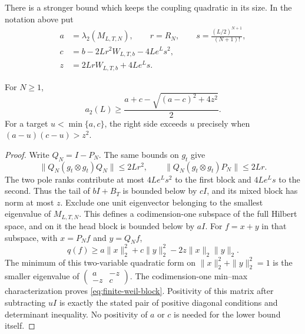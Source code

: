 There is a stronger bound which keeps the coupling quadratic in its
size.  In the notation above put
\[
 \begin{split}
 a&=\lambda_2(M_{L,T,N}),\qquad
 r=R_N,\qquad s=\frac{(L/2)^{N+1}}{(N+1)!},\\
 c&=b-2Lr^2W_{L,T,b}-4Le^Ls^2,\\
 z&=2LrW_{L,T,b}+4Le^Ls.
 \end{split}
\]

\begin{proposition}
\label{prop:finite-weil-block}
For $N\ge1$,
\begin{equation}
 a_2(L)\ge\frac{a+c-\sqrt{(a-c)^2+4z^2}}2.
 \label{eq:finite-weil-block}
\end{equation}
For a target $u<\min\{a,c\}$, the right side exceeds $u$ precisely
when $(a-u)(c-u)>z^2$.
\end{proposition}

\begin{proof}
Write $Q_N=I-P_N$.  The same bounds on $g_t$ give
\[
 \|Q_N(g_t\otimes g_t)Q_N\|\le2Lr^2,
 \qquad
 \|Q_N(g_t\otimes g_t)P_N\|\le2Lr.
\]
The two pole ranks contribute at most $4Le^Ls^2$ to the first block
and $4Le^Ls$ to the second.  Thus the tail of $bI+B_T$ is bounded
below by $cI$, and its mixed block has norm at most $z$.
Exclude one unit eigenvector belonging to the smallest eigenvalue of
$M_{L,T,N}$.  This defines a codimension-one subspace of the full
Hilbert space, and on it the head block is bounded below by $aI$.
For $f=x+y$ in that subspace, with $x=P_Nf$ and $y=Q_Nf$,
\[
 q(f)\ge a\|x\|_2^2+c\|y\|_2^2-2z\|x\|_2\|y\|_2.
\]
The minimum of this two-variable quadratic form on
$\|x\|_2^2+\|y\|_2^2=1$ is the smaller eigenvalue of
$\left(\begin{smallmatrix}a&-z\\-z&c\end{smallmatrix}\right)$.
The codimension-one min--max characterization proves
\eqref{eq:finite-weil-block}.  Positivity of this matrix after
subtracting $uI$ is exactly the stated pair of positive diagonal
conditions and determinant inequality.  No positivity of $a$ or $c$
is needed for the lower bound itself.
\end{proof}

